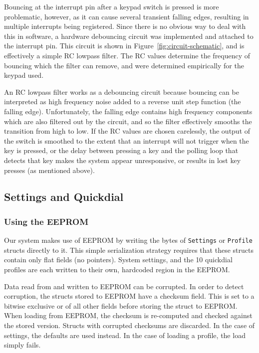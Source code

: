 \documentclass[11pt,a4paper,twocolumn]{scrartcl}
\begin{document}
Bouncing at the interrupt pin after a keypad switch is pressed is more problematic, however, as it can cause several transient falling edges, resulting in multiple interrupts being registered. Since there is no obvious way to deal with this in software, a hardware debouncing circuit was implemented and attached to the interrupt pin. This circuit is shown in Figure~\ref{fig:circuit-schematic}, and is effectively a simple RC lowpass filter. The RC values determine the frequency of bouncing which the filter can remove, and were determined empirically for the keypad used.

An RC lowpass filter works as a debouncing circuit because bouncing can be interpreted as high frequency noise added to a reverse unit step function (the falling edge). Unfortunately, the falling edge contains high frequency components which are also filtered out by the circuit, and so the filter effectively smooths the transition from high to low. If the RC values are chosen carelessly, the output of the switch is smoothed to the extent that an interrupt will not trigger when the key is pressed, or the delay between pressing a key and the polling loop that detects that key makes the system appear unresponsive, or results in lost key presses (as mentioned above).

\subsection{Settings and Quickdial} \label{settings-quickdial}

\subsubsection{Using the EEPROM}

Our system makes use of EEPROM by writing the bytes of \verb!Settings! or \verb!Profile! structs directly to it. This simple serialization strategy requires that these structs contain only flat fields (no pointers). System settings, and the 10 quickdial profiles are each written to their own, hardcoded region in the EEPROM.

Data read from and written to EEPROM can be corrupted. In order to detect corruption, the structs stored to EEPROM have a checksum field. This is set to a bitwise exclusive or of all other fields before storing the struct to EEPROM. When loading from EEPROM, the checksum is re-computed and checked against the stored version. Structs with corrupted checksums are discarded. In the case of settings, the defaults are used instead. In the case of loading a profile, the load simply fails.
\end{document}
